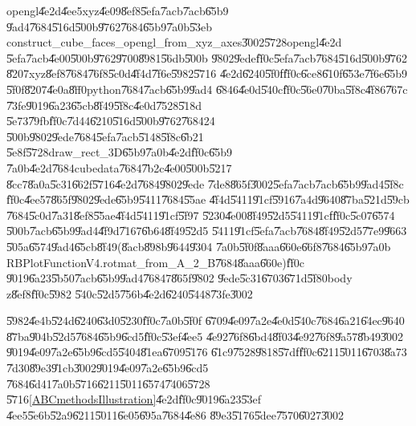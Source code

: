 \bigskip

opengl\U{4e2d}\U{4ee5}xyz\U{4e09}\U{8ef8}\U{5efa}\U{7acb}\U{7acb}\U{65b9}%
\U{9ad4}\U{7684}\U{516d}\U{500b}\U{9762}\U{7684}\U{65b9}\U{7a0b}\U{53eb}%
construct\_cube\_faces\_opengl\_from\_xyz\_axes\U{3002}\U{5728}opengl\U{4e2d}%
\U{5efa}\U{7acb}\U{4e00}\U{500b}\U{9762}\U{9700}\U{8981}\U{56db}\U{500b}%
\U{9802}\U{9ede}\U{ff0c}\U{5efa}\U{7acb}\U{7684}\U{516d}\U{500b}\U{9762}%
\U{8207}xyz\U{8ef8}\U{7684}\U{76f8}\U{5c0d}\U{4f4d}\U{7f6e}\U{5982}\U{5716}%
\U{4e2d}\U{6240}\U{5f0f}\U{ff0c}\U{6ce8}\U{610f}\U{653e}\U{7f6e}\U{65b9}%
\U{5f0f}\U{8207}\U{4e0a}\U{8ff0}python\U{7684}\U{7acb}\U{65b9}\U{9ad4}%
\U{6846}\U{4e0d}\U{540c}\U{ff0c}\U{56e0}\U{70ba}\U{5f8c}\U{4f86}\U{767c}%
\U{73fe}\U{9019}\U{6a23}\U{65cb}\U{8f49}\U{5f8c}\U{4e0d}\U{7528}\U{518d}%
\U{5e73}\U{79fb}\U{ff0c}\U{7d44}\U{6210}\U{516d}\U{500b}\U{9762}\U{7684}24%
\U{500b}\U{9802}\U{9ede}\U{7684}\U{5efa}\U{7acb}\U{5148}\U{5f8c}\U{6b21}%
\U{5e8f}\U{5728}draw\_rect\_3D\U{65b9}\U{7a0b}\U{4e2d}\U{ff0c}\U{65b9}%
\U{7a0b}\U{4e2d}\U{7684}cubedata\U{7684}\U{7b2c}\U{4e00}\U{500b}\U{5217}%
\U{8cc7}\U{8a0a}\U{5c31}\U{662f}\U{5716}\U{4e2d}\U{7684}\U{9802}\U{9ede}%
\U{7de8}\U{865f}\U{3002}\U{5efa}\U{7acb}\U{7acb}\U{65b9}\U{9ad4}\U{5f8c}%
\U{ff0c}\U{4ee5}7\U{865f}\U{9802}\U{9ede}\U{65b9}\U{5411}\U{7684}\U{55ae}%
\U{4f4d}\U{5411}\U{91cf}\U{5916}\U{7a4d}\U{9640}\U{87ba}\U{521d}\U{59cb}%
\U{7684}\U{5c0d}\U{7a31}\U{8ef8}\U{55ae}\U{4f4d}\U{5411}\U{91cf}\U{5f97}%
\U{5230}\U{4e00}\U{8f49}\U{52d5}\U{5411}\U{91cf}\U{ff0c}\U{5c07}\U{6574}%
\U{500b}\U{7acb}\U{65b9}\U{9ad4}\U{4f9d}\U{7167}\U{6b64}\U{8f49}\U{52d5}%
\U{5411}\U{91cf}\U{5efa}\U{7acb}\U{7684}\U{8f49}\U{52d5}\U{77e9}\U{9663}%
\U{505a}\U{6574}\U{9ad4}\U{65cb}\U{8f49}(\U{8acb}\U{898b}\U{9644}\U{9304}%
\U{7a0b}\U{5f0f}\U{8aaa}\U{660e}\U{66f8}\U{7684}\U{65b9}\U{7a0b}%
RBPlotFunctionV4.rotmat\_from\_A\_2\_B\U{7684}\U{8aaa}\U{660e})\U{ff0c}%
\U{9019}\U{6a23}\U{5b50}\U{7acb}\U{65b9}\U{9ad4}\U{7684}7\U{865f}\U{9802}%
\U{9ede}\U{5c31}\U{6703}\U{671d}\U{5f80}body z\U{8ef8}\U{ff0c}\U{5982}%
\U{540c}\U{52d5}\U{756b}\U{4e2d}\U{6240}\U{5448}\U{73fe}\U{3002}

\bigskip

\U{5982}\U{4e4b}\U{524d}\U{6240}\U{63d0}\U{5230}\U{ff0c}\U{7a0b}\U{5f0f}%
\U{6709}\U{4e09}\U{7a2e}\U{4e0d}\U{540c}\U{7684}\U{6a21}\U{64ec}\U{9640}%
\U{87ba}\U{904b}\U{52d5}\U{7684}\U{65b9}\U{6cd5}\U{ff0c}\U{53ef}\U{4ee5}%
\U{4e92}\U{76f8}\U{6bd4}\U{8f03}\U{4e92}\U{76f8}\U{9a57}\U{8b49}\U{3002}%
\U{9019}\U{4e09}\U{7a2e}\U{65b9}\U{6cd5}\U{5404}\U{81ea}\U{6709}\U{5176}%
\U{61c9}\U{7528}\U{9818}\U{57df}\U{ff0c}\U{6211}\U{5011}\U{6703}\U{8a73}%
\U{7d30}\U{89e3}\U{91cb}\U{3002}\U{9019}\U{4e09}\U{7a2e}\U{65b9}\U{6cd5}%
\U{7684}\U{6d41}\U{7a0b}\U{5716}\U{6211}\U{5011}\U{6574}\U{7406}\U{5728}%
\U{5716}\ref{ABCmethodsIllustration}\U{4e2d}\U{ff0c}\U{9019}\U{6a23}\U{53ef}%
\U{4ee5}\U{5e6b}\U{52a9}\U{6211}\U{5011}\U{6e05}\U{695a}\U{7684}\U{4e86}%
\U{89e3}\U{5176}\U{5dee}\U{7570}\U{6027}\U{3002}

